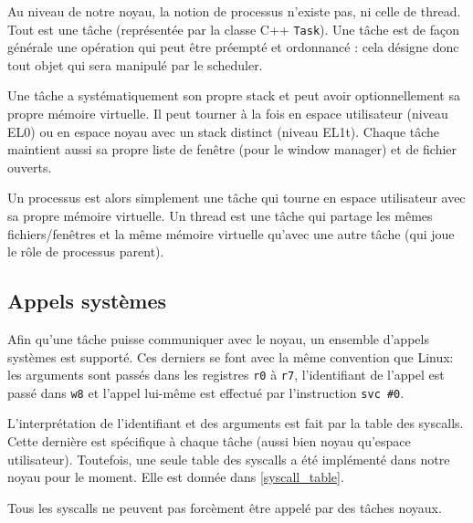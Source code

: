 \documentclass[french, 12pt]{article}
\begin{document}
Au niveau de notre noyau, la notion de processus n'existe pas, ni celle de thread. Tout est une tâche (représentée par la classe C++ \texttt{Task}). Une tâche est de façon générale une opération qui peut être préempté et ordonnancé : cela désigne donc tout objet qui sera manipulé par le scheduler.

Une tâche a systématiquement son propre stack et peut avoir optionnellement sa propre mémoire virtuelle. Il peut tourner à la fois en espace utilisateur (niveau EL0) ou en espace noyau avec un stack distinct (niveau EL1t). Chaque tâche maintient aussi sa propre liste de fenêtre (pour le window manager) et de fichier ouverts.

Un processus est alors simplement une tâche qui tourne en espace utilisateur avec sa propre mémoire virtuelle. Un thread est une tâche qui partage les mêmes fichiers/fenêtres et la même mémoire virtuelle qu'avec une autre tâche (qui joue le rôle de processus parent).

\subsection{Appels systèmes}

Afin qu'une tâche puisse communiquer avec le noyau, un ensemble d'appels systèmes est supporté. Ces derniers se font avec la même convention que Linux: les arguments sont passés dans les registres \texttt{r0} à \texttt{r7}, l'identifiant de l'appel est passé dans \texttt{w8} et l'appel lui-même est effectué par l'instruction \texttt{svc \#0}.

L'interprétation de l'identifiant et des arguments est fait par la table des syscalls. Cette dernière est spécifique à chaque tâche (aussi bien noyau qu'espace utilisateur). Toutefois, une seule table des syscalls a été implémenté dans notre noyau pour le moment. Elle est donnée dans \ref{syscall_table}.

Tous les syscalls ne peuvent pas forcèment être appelé par des tâches noyaux.
\end{document}
